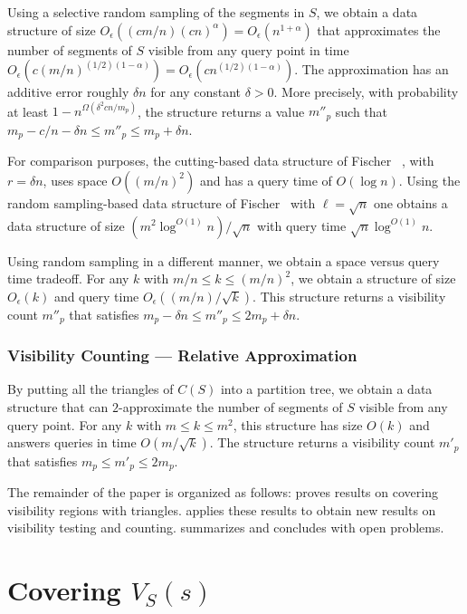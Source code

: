 \documentclass{patmorin}
\newcommand{\Oe}{O_\epsilon}
\begin{document}
Using a selective random sampling of the segments in $S$, we obtain a data
structure of size $\Oe((cm/n)(cn)^\alpha)=\Oe(n^{1+\alpha})$ that
approximates the number of segments of $S$ visible from any query point in
time $\Oe(c(m/n)^{(1/2)(1-\alpha)})=\Oe(cn^{(1/2)(1-\alpha)})$.  The approximation has an additive error
roughly $\delta n$ for any constant $\delta > 0$.  More precisely, with
probability at least $1-n^{\Omega(\delta^2 cn/m_p)}$, the structure returns
a value $m''_p$ such that $m_p - c/n-\delta n \le m''_p\le m_p+\delta n$.

For comparison purposes, the cutting-based data structure of Fischer
\etal\ \cite{fhjmz08,fhjmz09}, with $r=\delta n$, uses space
$O((m/n)^2)$
and has a query time of $O(\log n)$.  Using the random sampling-based
data structure of Fischer \etal\ with $\ell=\sqrt{n}$ one obtains a
data structure of size $(m^2\log^{O(1)} n)/\sqrt{n}$ with query time
$\sqrt{n}\log^{O(1)} n$.

Using random sampling in a different manner, we obtain a space versus query
time tradeoff. For any $k$ with $m/n \le k \le (m/n)^2$, we obtain a
structure of size $\Oe(k)$ and query time $\Oe((m/n)/\sqrt{k})$.  This
structure returns a visibility count $m''_p$ that satisfies $m_p-\delta n
\le m''_p \le 2m_p + \delta n$.  

\subsubsection{Visibility Counting --- Relative Approximation} 

By putting all the triangles of $C(S)$ into a partition tree, we obtain
a data structure that can $2$-approximate the number of segments of $S$
visible from any query point.  For any $k$ with $m\le k\le m^2$, this
structure has size $O(k)$ and answers queries in time $O(m/\sqrt{k})$.  The
structure returns a visibility count $m'_p$ that satisfies $m_p \le m'_p\le
2m_p$.

The remainder of the paper is organized as follows:  
proves results on covering visibility regions with triangles.
 applies these results to obtain new results on
visibility testing and counting.  summarizes and
concludes with open problems.

\section{Covering $V_S(s)$}
\end{document}
